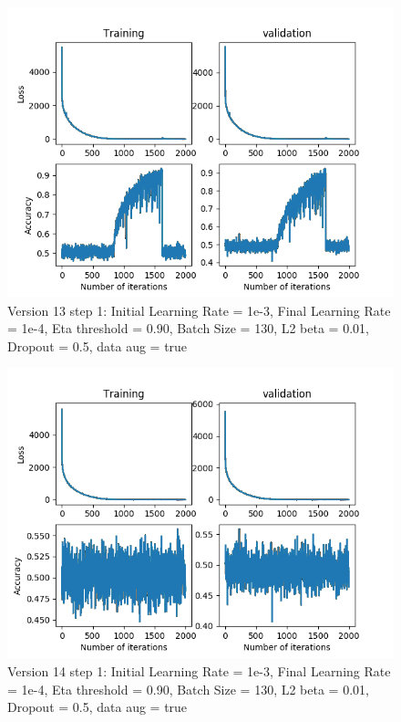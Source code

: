 \documentclass[12pt,reqno]{amsart}
\numberwithin{equation}{section}
\begin{document}
\begin{enumerate}
\begin{figure}[H]
\centering
\includegraphics[scale=0.6]{data_liquid140_version13_step1}
\caption{Version 13 step 1: Initial Learning Rate = 1e-3, Final Learning Rate = 1e-4, Eta threshold = 0.90, Batch Size = 130, L2 beta = 0.01, Dropout = 0.5, data aug = true}
\end{figure}

\begin{figure}[H]
\centering
\includegraphics[scale=0.6]{data_liquid140_version14_step1}
\caption{Version 14 step 1: Initial Learning Rate = 1e-3, Final Learning Rate = 1e-4, Eta threshold = 0.90, Batch Size = 130, L2 beta = 0.01, Dropout = 0.5, data aug = true}
\end{figure}


\end{enumerate}
\end{document}
